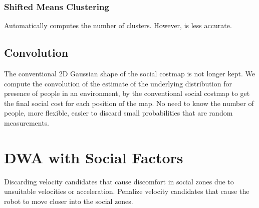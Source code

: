 \subsubsection{Shifted Means Clustering}
Automatically computes the number of clusters. However, is less accurate. 

\subsection{Convolution}
The conventional 2D Gaussian shape of the social costmap is not longer kept. We compute the convolution of the estimate of the underlying distribution for presence of people in an environment, by the conventional social costmap to get the final social cost for each position of the map.
No need to know the number of people, more flexible, easier to discard small probabilities that are random measurements.


\section{DWA with Social Factors}
Discarding velocity candidates that cause discomfort in social zones due to unsuitable velocities or acceleration.
Penalize velocity candidates that cause the robot to move closer into the social zones.

